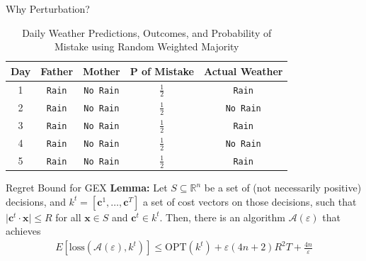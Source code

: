 \documentclass{beamer}
\begin{document}
\begin{frame}{Why Perturbation?}
    \begin{table}[ht]
        \centering
        \caption{Daily Weather Predictions, Outcomes, and Probability of Mistake using Random Weighted Majority}
        \begin{tabular}{|c|c|c|c|c|}
            \hline
            \textbf{Day} & \textbf{Father} & \textbf{Mother} & \textbf{$\mathbf{P}$ of Mistake} & \textbf{Actual Weather} \\
            \hline
            1 & \texttt{Rain} & \texttt{No Rain} & $\frac{1}{2}$ & \texttt{Rain} \\
            \hline
            2 & \texttt{Rain} & \texttt{No Rain} & $\frac{1}{2}$  & \texttt{No Rain} \\
            \hline
            3 & \texttt{Rain} & \texttt{No Rain} & $\frac{1}{2}$  & \texttt{Rain} \\
            \hline
            4 & \texttt{Rain} & \texttt{No Rain} & $\frac{1}{2}$  & \texttt{No Rain} \\
            \hline
            5 & \texttt{Rain} & \texttt{No Rain} & $\frac{1}{2}$  & \texttt{Rain} \\
            \hline
        \end{tabular}
    \end{table}
\end{frame}

\begin{frame}{Regret Bound for GEX}
    \textbf{Lemma:}
    Let $S \subseteq \mathbb{R}^n$ be a set of (not necessarily positive) decisions, and 
    $k^t = [\mathbf{c}^1, \ldots, \mathbf{c}^T]$ a set of cost vectors on those decisions, such that 
    $\lvert \mathbf{c}^t \cdot \mathbf{x} \rvert \leq R$ for all $\mathbf{x} \in S$ and $\mathbf{c}^t \in k^t$. 
    Then, there is an algorithm $\mathcal{A}(\varepsilon)$ that achieves
    \begin{align*}
        E[\text{loss}(\mathcal{A}(\varepsilon), k^t)] \leq \text{OPT}(k^t) + \varepsilon (4n + 2) R^2 T + \frac{4n}{\varepsilon}
    \end{align*}
\end{frame}
\end{document}

